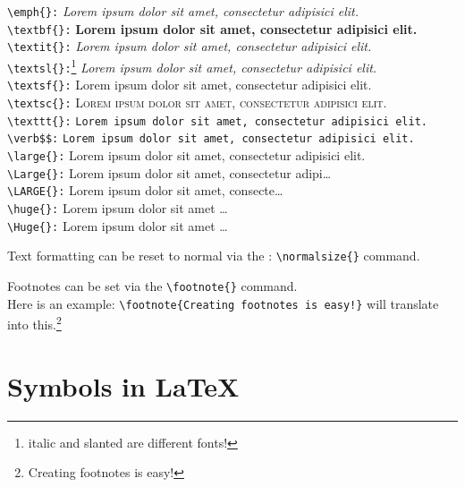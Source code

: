 \verb$\emph{}:$ \emph{Lorem ipsum dolor sit amet, consectetur adipisici elit.}\\
\verb$\textbf{}:$ \textbf{Lorem ipsum dolor sit amet, consectetur adipisici elit.}\\
\verb$\textit{}:$ \textit{Lorem ipsum dolor sit amet, consectetur adipisici elit.}\\
\verb$\textsl{}:$\footnote{italic and slanted are different fonts!} \textsl{Lorem ipsum dolor sit amet, consectetur adipisici elit.}\\
\verb$\textsf{}:$ \textsf{Lorem ipsum dolor sit amet, consectetur adipisici elit.}\\
\verb$\textsc{}:$ \textsc{Lorem ipsum dolor sit amet, consectetur adipisici elit.}\\
\verb$\texttt{}:$ \texttt{Lorem ipsum dolor sit amet, consectetur adipisici elit.}\\
\verb&\verb$$:& \verb$Lorem ipsum dolor sit amet, consectetur adipisici elit.$\\
\verb$\large{}:$ \large{Lorem ipsum dolor sit amet, consectetur adipisici elit.}\\
\verb$\Large{}:$ \Large{Lorem ipsum dolor sit amet, consectetur adipi\dots}\\
\verb$\LARGE{}:$ \LARGE{Lorem ipsum dolor sit amet, consecte\dots}\\
\verb$\huge{}:$ \huge{Lorem ipsum dolor sit amet \dots}\\
\verb$\Huge{}:$ \Huge{Lorem ipsum dolor sit amet \dots}
\normalsize{}

Text formatting can be reset to normal via the :
\verb$\normalsize{}$
command.

Footnotes can be set via the \verb$\footnote{}$ command.\\
Here is an example:
\verb$\footnote{Creating footnotes is easy!}$ will translate into this.\footnote{Creating footnotes is easy!}

\section{Symbols in \LaTeX}
\label{sec:symbols}

